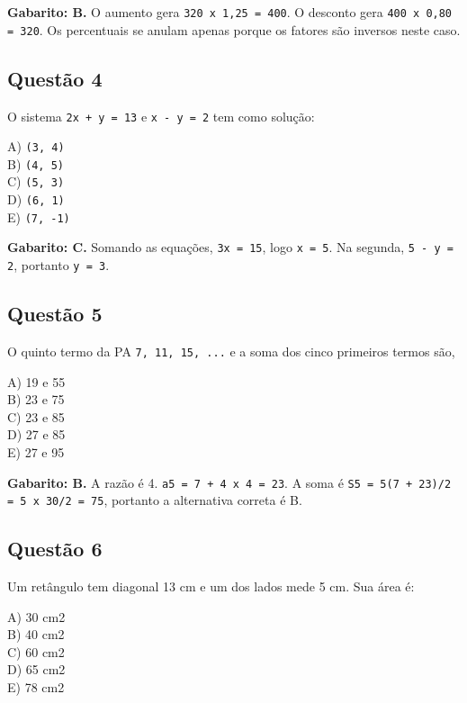 \documentclass[11pt,a4paper]{article}
\begin{document}
\begin{alerta}
\textbf{Gabarito: B.} O aumento gera \texttt{320 x 1,25 = 400}. O desconto gera \texttt{400 x 0,80 = 320}. Os percentuais se anulam apenas porque os fatores são inversos neste caso.
\end{alerta}

\subsection*{Questão 4}

O sistema \texttt{2x + y = 13} e \texttt{x - y = 2} tem como solução:

A) \texttt{(3, 4)} \\ B) \texttt{(4, 5)} \\ C) \texttt{(5, 3)} \\ D) \texttt{(6, 1)} \\ E) \texttt{(7, -1)}

\begin{alerta}
\textbf{Gabarito: C.} Somando as equações, \texttt{3x = 15}, logo \texttt{x = 5}. Na segunda, \texttt{5 - y = 2}, portanto \texttt{y = 3}.
\end{alerta}

\subsection*{Questão 5}

O quinto termo da PA \texttt{7, 11, 15, ...} e a soma dos cinco primeiros termos são,

A) 19 e 55 \\ B) 23 e 75 \\ C) 23 e 85 \\ D) 27 e 85 \\ E) 27 e 95

\begin{alerta}
\textbf{Gabarito: B.} A razão é 4. \texttt{a5 = 7 + 4 x 4 = 23}. A soma é \texttt{S5 = 5(7 + 23)/2 = 5 x 30/2 = 75}, portanto a alternativa correta é B.
\end{alerta}

\subsection*{Questão 6}

Um retângulo tem diagonal 13 cm e um dos lados mede 5 cm. Sua área é:

A) 30 cm2 \\ B) 40 cm2 \\ C) 60 cm2 \\ D) 65 cm2 \\ E) 78 cm2
\end{document}
